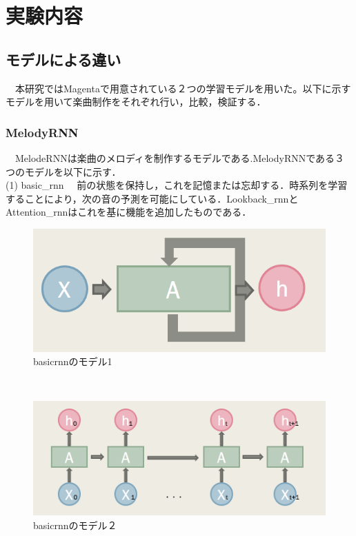 \chapter{実験内容}
\section{モデルによる違い}
　本研究ではMagentaで用意されている２つの学習モデルを用いた。以下に示すモデルを用いて楽曲制作をそれぞれ行い，比較，検証する．\\
\subsection{MelodyRNN}
　MelodeRNNは楽曲のメロディを制作するモデルである.MelodyRNNである３つのモデルを以下に示す．\\
(1) basic\_rnn
　前の状態を保持し，これを記憶または忘却する．時系列を学習することにより，次の音の予測を可能にしている．Lookback\_rnnとAttention\_rnnはこれを基に機能を追加したものである．\\
\begin{figure}[!ht]
    \begin{screen}
    \begin{center}
        \includegraphics[scale=1, clip]{./img/basic3.png}
        \caption{basicrnnのモデル1}
        \label{fig:basicrnnのモデル1}
    \end{center}
    \end{screen}
\end{figure}\\
\begin{figure}[!ht]
    \begin{screen}
    \begin{center}
        \includegraphics[scale=0.8, clip]{./img/basic4.png}
        \caption{basicrnnのモデル２}
        \label{fig:basicrnnのモデル２}
    \end{center}
    \end{screen}
\end{figure}\\
